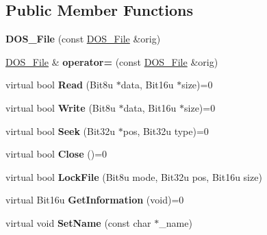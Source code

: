 \subsection*{Public Member Functions}
\begin{DoxyCompactItemize}
\item 
\hypertarget{classDOS__File_a1963c62fce9c71c29c5ce6596545a66f}{{\bfseries D\-O\-S\-\_\-\-File} (const \hyperlink{classDOS__File}{D\-O\-S\-\_\-\-File} \&orig)}\label{classDOS__File_a1963c62fce9c71c29c5ce6596545a66f}

\item 
\hypertarget{classDOS__File_a189eb3472b480f0fbcc1ef3c64aaee3d}{\hyperlink{classDOS__File}{D\-O\-S\-\_\-\-File} \& {\bfseries operator=} (const \hyperlink{classDOS__File}{D\-O\-S\-\_\-\-File} \&orig)}\label{classDOS__File_a189eb3472b480f0fbcc1ef3c64aaee3d}

\item 
\hypertarget{classDOS__File_aeebb41f3002ca630c8fb29575295a110}{virtual bool {\bfseries Read} (Bit8u $\ast$data, Bit16u $\ast$size)=0}\label{classDOS__File_aeebb41f3002ca630c8fb29575295a110}

\item 
\hypertarget{classDOS__File_a0d8f5391f10d80c2cee32906addcec3b}{virtual bool {\bfseries Write} (Bit8u $\ast$data, Bit16u $\ast$size)=0}\label{classDOS__File_a0d8f5391f10d80c2cee32906addcec3b}

\item 
\hypertarget{classDOS__File_a1698a73219cb9addf47c62cd33c56d5b}{virtual bool {\bfseries Seek} (Bit32u $\ast$pos, Bit32u type)=0}\label{classDOS__File_a1698a73219cb9addf47c62cd33c56d5b}

\item 
\hypertarget{classDOS__File_a69cb82dd341a8a126478c2e6235c0805}{virtual bool {\bfseries Close} ()=0}\label{classDOS__File_a69cb82dd341a8a126478c2e6235c0805}

\item 
\hypertarget{classDOS__File_afd1adec0fa0e51a83d5f47b4be21d890}{virtual bool {\bfseries Lock\-File} (Bit8u mode, Bit32u pos, Bit16u size)}\label{classDOS__File_afd1adec0fa0e51a83d5f47b4be21d890}

\item 
\hypertarget{classDOS__File_a3956bfb846f17650612c7665f0226c9c}{virtual Bit16u {\bfseries Get\-Information} (void)=0}\label{classDOS__File_a3956bfb846f17650612c7665f0226c9c}

\item 
\hypertarget{classDOS__File_ac6844051553dcd169d68cb52a2b7da7d}{virtual void {\bfseries Set\-Name} (const char $\ast$\-\_\-name)}\label{classDOS__File_ac6844051553dcd169d68cb52a2b7da7d}


\end{DoxyCompactItemize}
